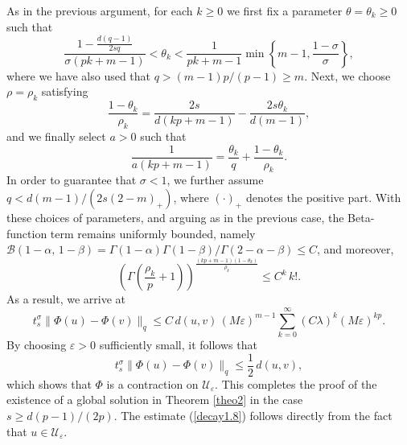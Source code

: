 \documentclass[a4paper,11pt]{amsart}
\renewcommand\eqref[1]{(\ref{#1})} %
\numberwithin{equation}{section}
\theoremstyle{plain}
\theoremstyle{definition}
\begin{document}
As in the previous argument, for each $k\geq 0$ we first fix a parameter $\theta=\theta_k\geq 0$ such that
\[
\frac{1-\frac{d(q-1)}{2sq}}{\sigma(pk+m-1)}
<
\theta_k
<
\frac{1}{pk+m-1}
\min\left\{m-1,\frac{1-\sigma}{\sigma}\right\},
\]
where we have also used that $q>(m-1)p/(p-1)\geq m.$
Next, we choose $\rho=\rho_k$ satisfying
\[
\frac{1-\theta_k}{\rho_k}
=
\frac{2s}{d(kp+m-1)}
-
\frac{2s\theta_k}{d(m-1)},
\]
and we finally select $a>0$ such that
\[
\frac{1}{a(kp+m-1)}
=
\frac{\theta_k}{q}
+
\frac{1-\theta_k}{\rho_k}.
\]
In order to guarantee that $\sigma<1$, we further assume $
q<d(m-1)/(2s(2-m)_+)$, where $(\cdot)_+$ denotes the positive part.
With these choices of parameters, and arguing as in the previous case, the Beta-function term remains uniformly bounded, namely $\mathcal{B}\!\left(
1-\alpha,
\,1-\beta
\right)=
\Gamma\!\left(1-\alpha\right)
\Gamma\!\left(1-\beta\right)/
\Gamma\!\left(2-\alpha-\beta\right)
\leq C$, and moreover,
\[
\left(
\Gamma\!\left(\frac{\rho_k}{p}+1\right)
\right)^{\frac{(kp+m-1)(1-\theta_k)}{\rho_k}}
\leq
C^k\,k!.
\]
As a result, we arrive at
\begin{equation}\label{eq21}
t_s^\sigma
\|\Phi(u)-\Phi(v)\|_{q}
\leq
C\, d(u,v)\,(M\varepsilon)^{m-1}
\sum_{k=0}^{\infty}
(C\lambda)^k (M\varepsilon)^{kp}.
\end{equation}
By choosing $\varepsilon>0$ sufficiently small, it follows that
\[
t_s^\sigma
\|\Phi(u)-\Phi(v)\|_{q}
\leq
\frac{1}{2}\, d(u,v),
\]
which shows that $\Phi$ is a contraction on $\mathcal{U}_\varepsilon$.
This completes the proof of the existence of a global solution in Theorem \ref{theo2} in the case
$s\geq d(p-1)/(2p)$. The estimate \eqref{decay1.8} follows directly from the fact that
$u\in \mathcal{U}_\varepsilon$.
\end{document}

